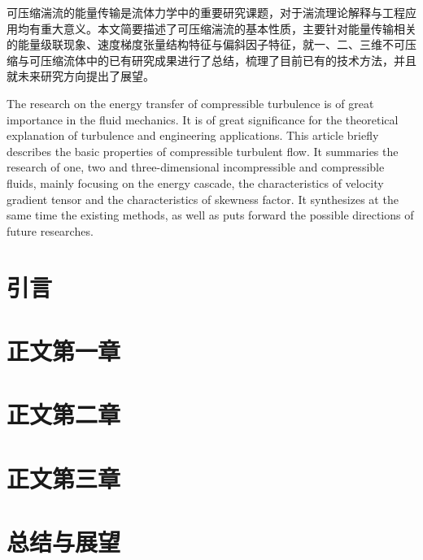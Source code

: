 \documentclass[review]{../package/ecpknproposal}
\begin{document}
\maketoc %

\linespread{1.5}
\pagestyle{frontmatter}
\maketocandfigure

\begin{cabstract}
可压缩湍流的能量传输是流体力学中的重要研究课题，对于湍流理论解释与工程应用均有重大意义。本文简要描述了可压缩湍流的基本性质，主要针对能量传输相关的能量级联现象、速度梯度张量结构特征与偏斜因子特征，就一、二、三维不可压缩与可压缩流体中的已有研究成果进行了总结，梳理了目前已有的技术方法，并且就未来研究方向提出了展望。
\end{cabstract}


\begin{eabstract}
The research on the energy transfer of compressible turbulence is of great importance in the fluid mechanics. It is of great significance for the theoretical explanation of turbulence and engineering applications. This article briefly describes the basic properties of compressible turbulent flow. It summaries the research of one, two and three-dimensional incompressible and compressible fluids, mainly focusing on the energy cascade, the characteristics of velocity gradient tensor and the characteristics of skewness factor. It synthesizes at the same time the existing methods, as well as puts forward the possible directions of future researches.
\end{eabstract}
    
\newpage

\section{引言}

\section{正文第一章}

\section{正文第二章}

\section{正文第三章}

\section{总结与展望}

\newpage
\nocite{*}
{}
\small


%
\end{document}
